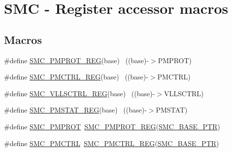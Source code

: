 \hypertarget{group___s_m_c___register___accessor___macros}{}\section{S\+MC -\/ Register accessor macros}
\label{group___s_m_c___register___accessor___macros}
\subsection*{Macros}
\begin{DoxyCompactItemize}
\item 
\#define \hyperlink{group___s_m_c___register___accessor___macros_ga376601b24e540392f6d12424bdaebab4}{S\+M\+C\+\_\+\+P\+M\+P\+R\+O\+T\+\_\+\+R\+EG}(base)                                      ~((base)-\/$>$P\+M\+P\+R\+OT)
\item 
\#define \hyperlink{group___s_m_c___register___accessor___macros_gaa927c65bb4333cf1bcff0d5fa57d8034}{S\+M\+C\+\_\+\+P\+M\+C\+T\+R\+L\+\_\+\+R\+EG}(base)                                      ~((base)-\/$>$P\+M\+C\+T\+RL)
\item 
\#define \hyperlink{group___s_m_c___register___accessor___macros_gaf9878592b3a3adba21106dca7ad03a45}{S\+M\+C\+\_\+\+V\+L\+L\+S\+C\+T\+R\+L\+\_\+\+R\+EG}(base)                                  ~((base)-\/$>$V\+L\+L\+S\+C\+T\+RL)
\item 
\#define \hyperlink{group___s_m_c___register___accessor___macros_ga77ded725e1d8ccc2781a0ee6dffc8809}{S\+M\+C\+\_\+\+P\+M\+S\+T\+A\+T\+\_\+\+R\+EG}(base)                                      ~((base)-\/$>$P\+M\+S\+T\+AT)
\item 
\#define \hyperlink{group___s_m_c___register___accessor___macros_ga43f6628ef790c765722cee208c2c477d}{S\+M\+C\+\_\+\+P\+M\+P\+R\+OT}~\hyperlink{group___s_m_c___register___accessor___macros_ga376601b24e540392f6d12424bdaebab4}{S\+M\+C\+\_\+\+P\+M\+P\+R\+O\+T\+\_\+\+R\+EG}(\hyperlink{group___s_m_c___peripheral_ga31b6c4571795341e6446800243313e56}{S\+M\+C\+\_\+\+B\+A\+S\+E\+\_\+\+P\+TR})
\item 
\#define \hyperlink{group___s_m_c___register___accessor___macros_ga4b2bae0309aecee21e9fe70ac7dbe3dc}{S\+M\+C\+\_\+\+P\+M\+C\+T\+RL}~\hyperlink{group___s_m_c___register___accessor___macros_gaa927c65bb4333cf1bcff0d5fa57d8034}{S\+M\+C\+\_\+\+P\+M\+C\+T\+R\+L\+\_\+\+R\+EG}(\hyperlink{group___s_m_c___peripheral_ga31b6c4571795341e6446800243313e56}{S\+M\+C\+\_\+\+B\+A\+S\+E\+\_\+\+P\+TR})
\item 

\end{DoxyCompactItemize}
